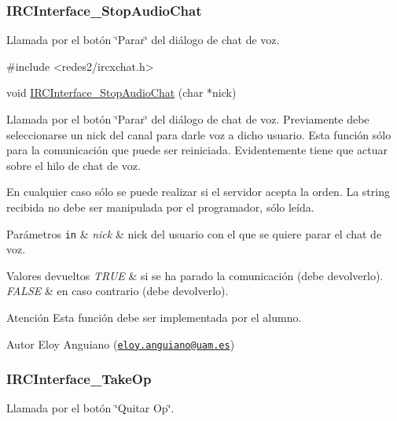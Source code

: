  \hypertarget{IRCInterface_StopAudioChat}{}\subsubsection{I\+R\+C\+Interface\+\_\+\+Stop\+Audio\+Chat}\label{IRCInterface_StopAudioChat}
Llamada por el botón \char`\"{}\+Parar\char`\"{} del diálogo de chat de voz.


\begin{DoxyCode}
\textcolor{preprocessor}{#include <redes2/ircxchat.h>}

\textcolor{keywordtype}{void} \hyperlink{G-2313-06-P2__client_8c_a754a3d3dd311194637c07cc701e7d507}{IRCInterface\_StopAudioChat} (\textcolor{keywordtype}{char} *nick)
\end{DoxyCode}


Llamada por el botón \char`\"{}\+Parar\char`\"{} del diálogo de chat de voz. Previamente debe seleccionarse un nick del canal para darle voz a dicho usuario. Esta función sólo para la comunicación que puede ser reiniciada. Evidentemente tiene que actuar sobre el hilo de chat de voz.

En cualquier caso sólo se puede realizar si el servidor acepta la orden. La string recibida no debe ser manipulada por el programador, sólo leída.


\begin{DoxyParams}[1]{Parámetros}
\mbox{\tt in}  & {\em nick} & nick del usuario con el que se quiere parar el chat de voz.\\
\hline
\end{DoxyParams}

\begin{DoxyRetVals}{Valores devueltos}
{\em T\+R\+UE} & si se ha parado la comunicación (debe devolverlo). \\
\hline
{\em F\+A\+L\+SE} & en caso contrario (debe devolverlo).\\
\hline
\end{DoxyRetVals}
\begin{DoxyWarning}{Atención}
Esta función debe ser implementada por el alumno.
\end{DoxyWarning}
\begin{DoxyAuthor}{Autor}
Eloy Anguiano (\href{mailto:eloy.anguiano@uam.es}{\tt eloy.\+anguiano@uam.\+es})
\end{DoxyAuthor}


 \hypertarget{IRCInterface_TakeOp}{}\subsubsection{I\+R\+C\+Interface\+\_\+\+Take\+Op}\label{IRCInterface_TakeOp}
Llamada por el botón \char`\"{}\+Quitar Op\char`\"{}.


